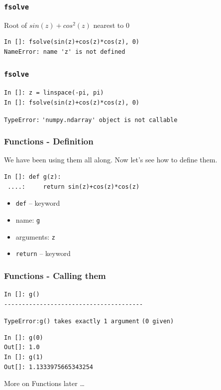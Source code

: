 \documentclass[14pt,compress]{beamer}
\newcommand{\typ}[1]{\lstinline{#1}}
\begin{document}
\begin{frame}[fragile]
\frametitle{\typ{fsolve}}
Root of $sin(z)+cos^2(z)$ nearest to $0$
\begin{lstlisting}
In []: fsolve(sin(z)+cos(z)*cos(z), 0)
NameError: name 'z' is not defined
\end{lstlisting}
\end{frame}

\begin{frame}[fragile]
\frametitle{\typ{fsolve}}
\begin{lstlisting}
In []: z = linspace(-pi, pi)
In []: fsolve(sin(z)+cos(z)*cos(z), 0)
\end{lstlisting}
\begin{small}
\alert{\typ{TypeError:}}
\typ{'numpy.ndarray' object is not callable}
\end{small}
\end{frame}

\begin{frame}[fragile]
\frametitle{Functions - Definition}
We have been using them all along. Now let's see how to define them.
\begin{lstlisting}
In []: def g(z):
 ....:     return sin(z)+cos(z)*cos(z)
\end{lstlisting}
\begin{itemize}
\item \typ{def} -- keyword
\item name: \typ{g}
\item arguments: \typ{z}
\item \typ{return} -- keyword
\end{itemize}
\end{frame}

\begin{frame}[fragile]
\frametitle{Functions - Calling them}
\begin{lstlisting}
In []: g()
---------------------------------------
\end{lstlisting}
\alert{\typ{TypeError:}}\typ{g() takes exactly 1 argument}
\typ{(0 given)}
\begin{lstlisting}
In []: g(0)
Out[]: 1.0
In []: g(1)
Out[]: 1.1333975665343254
\end{lstlisting}
More on Functions later \ldots
\end{frame}
\end{document}
